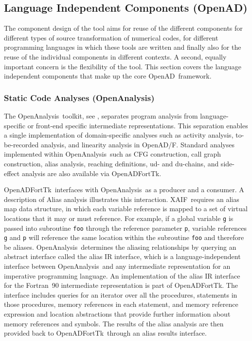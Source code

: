 \documentclass[11pt]{article}
\newcommand{\OpenADF}{OpenAD/F}
\newcommand{\OpenAD}{OpenAD}
\newcommand{\OpenADFortTk}{OpenADFortTk}
\newcommand{\OpenAnalysis}{OpenAnalysis}
\newcommand{\xaif}{XAIF}
\newcommand{\code}[1]{{\small\tt{#1}}}
\begin{document}
\subsection{Language Independent Components (\OpenAD)}\label{ssec:openadcomponents}

The component design of the tool aims for reuse of the different components 
for different types of source transformation of numerical codes, for 
different programming languages in which these tools are written and finally 
also for the reuse of the individual components in different contexts. 
A second, equally important concern is the flexibility of the tool.  
This section covers the language independent components that make up the core \OpenAD\ framework. 

\subsubsection{Static Code Analyses (\OpenAnalysis)} \label{sssec:openanalysis}

The \OpenAnalysis\ toolkit, see \cite{oaWeb}, separates program
analysis from language-specific or front-end specific intermediate
representations.  This separation enables a single implementation of
domain-specific analyses such as activity analysis, to-be-recorded
analysis, and linearity analysis in \OpenADF.  Standard analyses
implemented within \OpenAnalysis\ such as CFG construction, call graph
construction, alias analysis, reaching definitions, ud- and du-chains,
and side-effect analysis are also available via
\OpenADFortTk.

\OpenADFortTk\ interfaces with \OpenAnalysis\ as a producer and a
consumer.  A description of Alias analysis illustrates this
interaction.  \xaif\ requires an alias map data structure, in which
each variable reference is mapped to a set of virtual locations that
it may or must reference.  For example, if a global variable \code{g}
is passed into subroutine \code{foo} through the reference parameter
\code{p}, variable references \code{g} and \code{p} will reference the
same location within the subroutine \code{foo} and therefore be aliases.  
\OpenAnalysis\ determines the aliasing relationships by querying an
abstract interface called the alias IR interface, which is a 
language-independent interface between \OpenAnalysis\ and any
intermediate representation for an imperative programming language.  
An implementation of the alias IR interface for the Fortran~90
intermediate representation is part of
\OpenADFortTk.  The interface includes queries for an iterator over
all the procedures, statements in those procedures, memory references
in each statement, and memory reference expression and location
abstractions that provide further information about memory references
and symbols.  The results of the alias analysis are then provided back
to \OpenADFortTk\ through an alias results interface.
\end{document}
